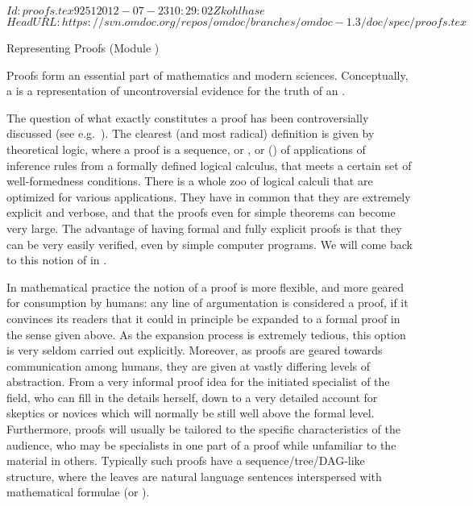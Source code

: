 \svnInfo $Id: proofs.tex 9251 2012-07-23 10:29:02Z kohlhase $
\svnKeyword $HeadURL: https://svn.omdoc.org/repos/omdoc/branches/omdoc-1.3/doc/spec/proofs.tex $

\begin{tchapter}[id=proofs,short=Representing Proofs]{Representing Proofs (Module {})}

  Proofs form an essential part of mathematics and modern sciences.  Conceptually, a
  {} is a representation of uncontroversial evidence for the truth of an
  {}.
  
  The question of what exactly constitutes a proof has been controversially discussed (see
  e.g.~\cite{BarCoh:ecm01}). The clearest (and most radical) definition is given by
  theoretical logic, where a proof is a sequence, or {}, or
  {} ({})
  of applications of inference rules from a formally defined logical calculus, that meets
  a certain set of well-formedness conditions.  There is a whole zoo of logical
  calculi that are optimized for various applications. They have
  in common that they are extremely explicit and verbose, and that the proofs even for
  simple theorems can become very large. The advantage of having formal and fully explicit
  proofs is that they can be very easily verified, even by simple computer programs.  We
  will come back to this notion of {} in {}.

  In mathematical practice the notion of a proof is more flexible, and more geared for
  consumption by humans: any line of argumentation is considered a proof, if it convinces
  its readers that it could in principle be expanded to a formal proof in the sense given
  above. As the expansion process is extremely tedious, this option is very seldom carried
  out explicitly. Moreover, as proofs are geared towards communication among humans, they
  are given at vastly differing levels of abstraction. From a very informal proof idea for
  the initiated specialist of the field, who can fill in the details herself, down to a
  very detailed account for skeptics or novices which will normally be still well above
  the formal level. Furthermore, proofs will usually be tailored to the specific
  characteristics of the audience, who may be specialists in one part of a proof while
  unfamiliar to the material in others. Typically such proofs have a
  sequence/tree/DAG-like structure, where the leaves are natural language sentences
  interspersed with mathematical formulae (or {}).


\end{tchapter}
